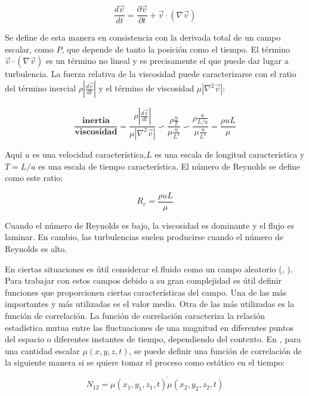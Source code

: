 \begin{equation}
    \frac{d \vec{v}}{dt} = \frac{\partial \vec{v}}{\partial t} + \vec{v}\cdot (\nabla \vec v)
\end{equation}

Se define de esta manera en consistencia con la derivada total de un campo escalar, como $P$, que depende de tanto la posición como el tiempo. El término $\vec{v}\cdot (\nabla \vec v)$ es un término no lineal y es precisamente el que puede dar lugar a turbulencia. La fuerza relativa de la viscosidad puede caracterizarse con el ratio del término inercial $\rho |\frac{d\vec v}{d t}|$ y el término de viscosidad $\mu | \nabla ^2 \vec v|$:

\begin{equation}
    \frac{\textbf{inertia}}{\textbf{viscosidad}} = \frac{\rho |\frac{d\vec v}{d t}|}{\mu | \nabla ^2 \vec v|} \backsim \frac{\rho \frac{u}{T}}{\mu \frac{u}{L^2}} \backsim \frac{\rho \frac{u}{L/u}}{\mu \frac{u}{L^2}} = \frac{\rho u L}{\mu}
\end{equation}

Aquí $u$ es una velocidad característica,$L$ es una escala de longitud característica y $T = L/u$ es una escala de tiempo característica. El número de Reynolds se define como este ratio:

\begin{equation}
    R_e = \frac{\rho u L}{\mu}
\end{equation}

Cuando el número de Reynolds es bajo, la viscosidad es dominante y el flujo es laminar. En cambio, las turbulencias suelen producirse cuando el número de Reynolds es alto.

En ciertas situaciones es útil considerar el fluido como un campo aleatorio (\cite{chernov_wave_1967}, \cite{tatarski_wave_1967}). Para trabajar con estos campos debido a su gran complejidad es útil definir funciones que proporcionen ciertas características del campo. Una de las más importantes y más utilizadas es el valor medio. Otra de las más utilizadas es la función de correlación. La función de correlación caracteriza la relación estadística mutua entre las fluctuaciones de una magnitud en diferentes puntos del espacio o diferentes instantes de tiempo, dependiendo del contexto. En \cite{chernov_wave_1967}, para una cantidad escalar $\mu (x, y, z, t)$, se puede definir una función de correlación de la siguiente manera si se quiere tomar el proceso como estático en el tiempo:

\begin{equation}\label{ec:correlation_1}
    N_{12} = \overline{\mu(x_1, y_1, z_1, t)\mu(x_2, y_2, z_2, t)}
\end{equation}

